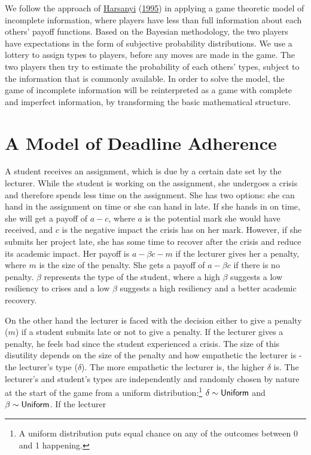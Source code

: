 \documentclass[11pt,preprint, authoryear]{elsarticle}
\numberwithin{equation}{section}
\numberwithin{figure}{section}
\numberwithin{table}{section}
\let\rmarkdownfootnote\footnote%
\def\footnote{\protect\rmarkdownfootnote}
\begin{document}
We follow the approach of \protect\hyperlink{ref-harsanyi}{Harsanyi}
(\protect\hyperlink{ref-harsanyi}{1995}) in applying a game theoretic
model of incomplete information, where players have less than full
information about each others' payoff functions. Based on the Bayesian
methodology, the two players have expectations in the form of subjective
probability distributions. We use a lottery to assign types to players,
before any moves are made in the game. The two players then try to
estimate the probability of each others' types, subject to the
information that is commonly available. In order to solve the model, the
game of incomplete information will be reinterpreted as a game with
complete and imperfect information, by transforming the basic
mathematical structure.

\hypertarget{a-model-of-deadline-adherence}{%
\section{\texorpdfstring{A Model of Deadline Adherence
\label{game}}{A Model of Deadline Adherence }}\label{a-model-of-deadline-adherence}}

A student receives an assignment, which is due by a certain date set by
the lecturer. While the student is working on the assignment, she
undergoes a crisis and therefore spends less time on the assignment. She
has two options: she can hand in the assignment on time or she can hand
in late. If she hands in on time, she will get a payoff of \(a-c\),
where \(a\) is the potential mark she would have received, and \(c\) is
the negative impact the crisis has on her mark. However, if she submits
her project late, she has some time to recover after the crisis and
reduce its academic impact. Her payoff is \(a-\beta c -m\) if the
lecturer gives her a penalty, where \(m\) is the size of the penalty.
She gets a payoff of \(a-\beta c\) if there is no penalty. \(\beta\)
represents the type of the student, where a high \(\beta\) suggests a
low resiliency to crises and a low \(\beta\) suggests a high resiliency
and a better academic recovery.

On the other hand the lecturer is faced with the decision either to give
a penalty (\(m\)) if a student submits late or not to give a penalty. If
the lecturer gives a penalty, he feels bad since the student experienced
a crisis. The size of this disutility depends on the size of the penalty
and how empathetic the lecturer is - the lecturer's type (\(\delta\)).
The more empathetic the lecturer is, the higher \(\delta\) is. The
lecturer's and student's types are independently and randomly chosen by
nature at the start of the game from a uniform distribution:\footnote{A
  uniform distribution puts equal chance on any of the outcomes between
  0 and 1 happening.} \(\delta \sim {\sf Uniform}\) and
\(\beta \sim {\sf Uniform}\). If the lecturer
\end{document}
